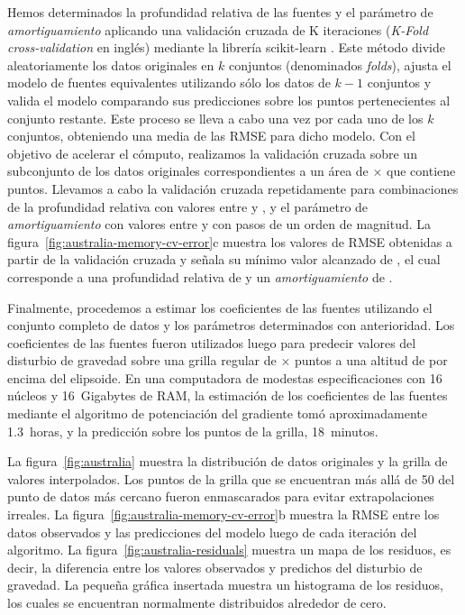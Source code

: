 Hemos determinados la profundidad relativa de las fuentes y el parámetro de
\emph{amortiguamiento} aplicando una validación cruzada de K iteraciones
(\emph{K-Fold cross-validation} en inglés) mediante la librería scikit-learn
\citep{sklearn2011}.
Este método divide aleatoriamente los datos originales en $k$ conjuntos
(denominados \emph{folds}), ajusta el modelo de fuentes equivalentes utilizando
sólo los datos de $k - 1$ conjuntos y valida el modelo comparando sus
predicciones sobre los puntos pertenecientes al conjunto restante.
Este proceso se lleva a cabo una vez por cada uno de los $k$ conjuntos,
obteniendo una media de las \ac{RMSE} para dicho modelo.
Con el objetivo de acelerar el cómputo, realizamos la validación cruzada sobre
un subconjunto de los datos originales correspondientes a un área de
\AustraliaSmallAreaEastingSize{}$\times$\AustraliaSmallAreaNorthingSize{}
que contiene \AustraliaSmallAreaNPoints{} puntos.
Llevamos a cabo la validación cruzada repetidamente para combinaciones de la
profundidad relativa con valores entre \AustraliaDepthMin{}
y \AustraliaDepthMax{}, y el parámetro de \emph{amortiguamiento} con valores
entre \AustraliaDampingMin{} y \AustraliaDampingMax{} con pasos de un orden de
magnitud.
La figura~\ref{fig:australia-memory-cv-error}c muestra los valores de \ac{RMSE}
obtenidas a partir de la validación cruzada y señala su mínimo valor alcanzado
de \AustraliaEqlRmsScore{}, el cual corresponde a una profundidad relativa de
\AustraliaEqlDepth{} y un \emph{amortiguamiento} de \AustraliaEqlDamping{}.

Finalmente, procedemos a estimar los coeficientes de las fuentes utilizando el
conjunto completo de datos y los parámetros determinados con anterioridad.
Los coeficientes de las fuentes fueron utilizados luego para predecir valores
del disturbio de gravedad sobre una grilla regular de
\AustraliaEqlGridNLongitude{}$\times$\AustraliaEqlGridNLatitude{} puntos a una
altitud de
\AustraliaEqlGridHeight{} por encima del elipsoide.
En una computadora de modestas especificaciones con 16 núcleos y 16~Gigabytes
de RAM, la estimación de los coeficientes de las \AustraliaEqlNSources{}
fuentes mediante el algoritmo de potenciación del gradiente tomó
aproximadamente 1.3~horas, y la predicción sobre los puntos de la grilla,
18~minutos.

La figura~\ref{fig:australia}
muestra la distribución de datos originales y la grilla de valores
interpolados.
Los puntos de la grilla que se encuentran más allá de 50\km{} del punto de
datos más cercano fueron enmascarados para evitar extrapolaciones irreales.
La figura~\ref{fig:australia-memory-cv-error}b muestra la \ac{RMSE} entre los
datos observados y las predicciones del modelo luego de cada iteración del
algoritmo.
La figura~\ref{fig:australia-residuals}
muestra un mapa de los residuos, es decir, la diferencia entre los valores
observados y predichos del disturbio de gravedad.
La pequeña gráfica insertada muestra un histograma de los residuos, los cuales
se encuentran normalmente distribuidos alrededor de cero.

